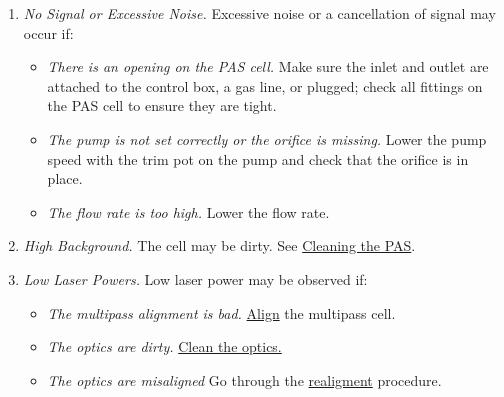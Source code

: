 \documentclass[]{book}
\providecommand{\tightlist}{%
  \setlength{\itemsep}{0pt}\setlength{\parskip}{0pt}}
\begin{document}
\begin{enumerate}
\def\labelenumi{\arabic{enumi}.}
\tightlist
\item
  \emph{No Signal or Excessive Noise.} Excessive noise or a cancellation
  of signal may occur if:

  \begin{itemize}
  \tightlist
  \item
    \emph{There is an opening on the PAS cell.} Make sure the inlet and
    outlet are attached to the control box, a gas line, or plugged;
    check all fittings on the PAS cell to ensure they are tight.
  \item
    \emph{The pump is not set correctly or the orifice is missing.}
    Lower the pump speed with the trim pot on the pump and check that
    the orifice is in place.
  \item
    \emph{The flow rate is too high.} Lower the flow rate.
  \end{itemize}
\item
  \emph{High Background.} The cell may be dirty. See
  \href{maintainance.html\#cleaning-the-pas}{Cleaning the PAS}.
\item
  \emph{Low Laser Powers.} Low laser power may be observed if:

  \begin{itemize}
  \tightlist
  \item
    \emph{The multipass alignment is bad.}
    \href{maintainance.html\#realignment}{Align} the multipass cell.
  \item
    \emph{The optics are dirty.}
    \href{maintainance.html\#cleaning-the-optics}{Clean the optics.}
  \item
    \emph{The optics are misaligned} Go through the
    \href{maintainance.html\#realignment}{realigment} procedure.
  \end{itemize}
\end{enumerate}
\end{document}
